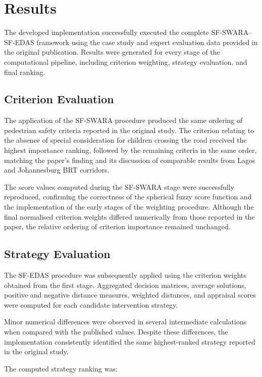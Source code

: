 \documentclass[11pt]{article}
\begin{document}
\section{Results}
The developed implementation successfully executed the complete SF-SWARA--SF-EDAS framework using the case study and expert evaluation data provided in the original publication. Results were generated for every stage of the computational pipeline, including criterion weighting, strategy evaluation, and final ranking.

\subsection{Criterion Evaluation}
The application of the SF-SWARA procedure produced the same ordering of pedestrian safety criteria reported in the original study. The criterion relating to the absence of special consideration for children crossing the road received the highest importance ranking, followed by the remaining criteria in the same order, matching the paper's finding and its discussion of comparable results from Lagos and Johannesburg BRT corridors.

The score values computed during the SF-SWARA stage were successfully reproduced, confirming the correctness of the spherical fuzzy score function and the implementation of the early stages of the weighting procedure. Although the final normalised criterion weights differed numerically from those reported in the paper, the relative ordering of criterion importance remained unchanged.

\subsection{Strategy Evaluation}
The SF-EDAS procedure was subsequently applied using the criterion weights obtained from the first stage. Aggregated decision matrices, average solutions, positive and negative distance measures, weighted distances, and appraisal scores were computed for each candidate intervention strategy.

Minor numerical differences were observed in several intermediate calculations when compared with the published values. Despite these differences, the implementation consistently identified the same highest-ranked strategy reported in the original study.

The computed strategy ranking was:
\end{document}
